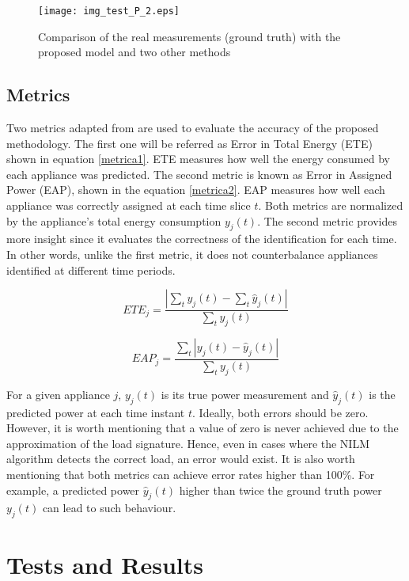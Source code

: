 \begin{figure*}[tb]
    \centering
    \texttt{[image: img\_test\_P\_2.eps]}%
    \caption{Comparison of the real measurements (ground truth) with the proposed model and two other methods}
    \label{system2}
\end{figure*}

\subsection{Metrics}
Two metrics adapted from \cite{batra2014} are used to evaluate the accuracy of the proposed methodology. The first one will be referred as Error in Total Energy (ETE) shown in equation \eqref{metrica1}. ETE measures how well the energy consumed by each appliance was predicted. The second metric is known as Error in Assigned Power (EAP), shown in the equation \eqref{metrica2}. EAP measures how well each appliance was correctly assigned at each time slice $t$. Both metrics are normalized by the appliance's total energy consumption $y_j(t)$. The second metric provides more insight since it evaluates the correctness of the identification for each time. In other words, unlike the first metric, it does not counterbalance appliances identified at different time periods. 

\begin{equation}\label{metrica1}
   ETE_j = \dfrac{|\sum_{t}{y_j(t)} - \sum_{t}{\hat{y}_j(t)}|}{\sum_{t} { y_j(t)}}
\end{equation}

\begin{equation}\label{metrica2}
   EAP_j = \dfrac{\sum_{t} { |y_j(t) - \hat{y}_j(t)|}}{\sum_{t} { y_j(t)}}
\end{equation}


For a given appliance $j$, $y_j(t)$ is its true power measurement and $\hat{y}_j(t)$ is the predicted power at each time instant $t$. Ideally, both errors should be zero. However, it is worth mentioning that a value of zero is never achieved due to the approximation of the load signature. Hence, even in cases where the NILM algorithm detects the correct load, an error would exist. It is also worth mentioning that both metrics can achieve error rates higher than 100\%. For example, a predicted power $\hat{y}_j(t)$ higher than twice the ground truth power $y_j(t)$ can lead to such behaviour.  

\section{Tests and Results}

